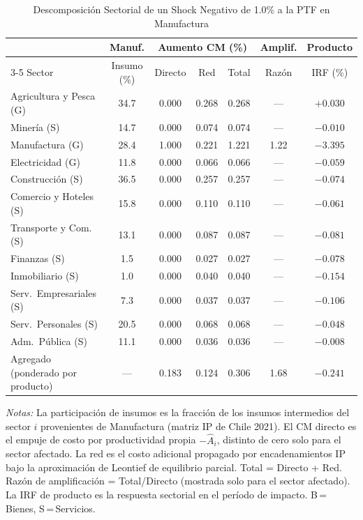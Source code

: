 \begin{table}[htbp]
\centering
\caption{Descomposición Sectorial de un Shock Negativo de 1.0\% a la PTF en Manufactura}
\label{tab:mfg_decomp}
\begin{threeparttable}
\small
\begin{tabular}{@{}l c c c c c c@{}}
\toprule
 & Manuf. & \multicolumn{3}{c}{Aumento CM (\%)} & Amplif. & Producto \\
\cmidrule(lr){3-5}
Sector & Insumo (\%) & Directo & Red & Total & Razón & IRF (\%) \\
\midrule
Agricultura y Pesca (G) & 34.7 & 0.000 & 0.268 & 0.268 & --- & $+0.030$ \\
Minería (S) & 14.7 & 0.000 & 0.074 & 0.074 & --- & $-0.010$ \\
Manufactura (G) & 28.4 & 1.000 & 0.221 & 1.221 &  1.22 & $-3.395$ \\
Electricidad (G) & 11.8 & 0.000 & 0.066 & 0.066 & --- & $-0.059$ \\
Construcción (S) & 36.5 & 0.000 & 0.257 & 0.257 & --- & $-0.074$ \\
Comercio y Hoteles (S) & 15.8 & 0.000 & 0.110 & 0.110 & --- & $-0.061$ \\
Transporte y Com. (S) & 13.1 & 0.000 & 0.087 & 0.087 & --- & $-0.081$ \\
Finanzas (S) &  1.5 & 0.000 & 0.027 & 0.027 & --- & $-0.078$ \\
Inmobiliario (S) &  1.0 & 0.000 & 0.040 & 0.040 & --- & $-0.154$ \\
Serv.\ Empresariales (S) &  7.3 & 0.000 & 0.037 & 0.037 & --- & $-0.106$ \\
Serv.\ Personales (S) & 20.5 & 0.000 & 0.068 & 0.068 & --- & $-0.048$ \\
Adm.\ Pública (S) & 11.1 & 0.000 & 0.036 & 0.036 & --- & $-0.008$ \\
\midrule
Agregado (ponderado por producto) & --- & 0.183 & 0.124 & 0.306 &  1.68 & $-0.241$ \\
\bottomrule
\end{tabular}
\begin{tablenotes}[flushleft]
\footnotesize
\item \textit{Notas:} La participación de insumos es la fracción de los insumos intermedios del sector $i$ provenientes de Manufactura (matriz IP de Chile 2021). El CM directo es el empuje de costo por productividad propia $-\hat A_i$, distinto de cero solo para el sector afectado. La red es el costo adicional propagado por encadenamientos IP bajo la aproximación de Leontief de equilibrio parcial. Total = Directo + Red. Razón de amplificación = Total/Directo (mostrada solo para el sector afectado). La IRF de producto es la respuesta sectorial en el período de impacto. B\,=\,Bienes, S\,=\,Servicios.
\end{tablenotes}
\end{threeparttable}
\end{table}
